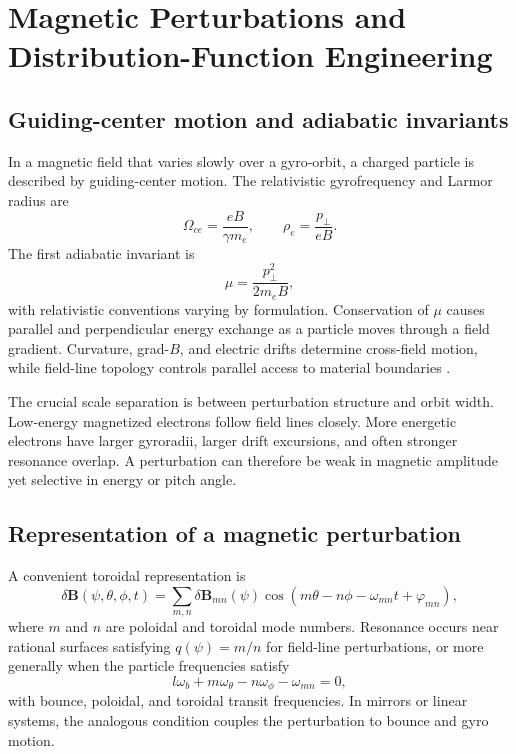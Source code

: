 \chapter{Magnetic Perturbations and Distribution-Function Engineering}
\label{ch:magnetic-control}

\section{Guiding-center motion and adiabatic invariants}

In a magnetic field that varies slowly over a gyro-orbit, a charged particle is described by guiding-center motion. The relativistic gyrofrequency and Larmor radius are
\begin{equation}
\Omega_{ce}=\frac{eB}{\gamma m_e},
\qquad
\rho_e=\frac{p_\perp}{eB}.
\label{eq:gyro}
\end{equation}
The first adiabatic invariant is
\begin{equation}
\mu=\frac{p_\perp^2}{2m_eB},
\label{eq:mu}
\end{equation}
with relativistic conventions varying by formulation. Conservation of $\mu$ causes parallel and perpendicular energy exchange as a particle moves through a field gradient. Curvature, grad-$B$, and electric drifts determine cross-field motion, while field-line topology controls parallel access to material boundaries \cite{hazeltine2003,freidberg2014,wesson2011}.

The crucial scale separation is between perturbation structure and orbit width. Low-energy magnetized electrons follow field lines closely. More energetic electrons have larger gyroradii, larger drift excursions, and often stronger resonance overlap. A perturbation can therefore be weak in magnetic amplitude yet selective in energy or pitch angle.

\section{Representation of a magnetic perturbation}

A convenient toroidal representation is
\begin{equation}
\delta\mathbf{B}(\psi,\theta,\phi,t)
=\sum_{m,n}\delta\mathbf{B}_{mn}(\psi)
\cos\!\left(m\theta-n\phi-\omega_{mn}t+\varphi_{mn}\right),
\label{eq:rmp}
\end{equation}
where $m$ and $n$ are poloidal and toroidal mode numbers. Resonance occurs near rational surfaces satisfying $q(\psi)=m/n$ for field-line perturbations, or more generally when the particle frequencies satisfy
\begin{equation}
 l\omega_b + m\omega_\theta-n\omega_\phi-\omega_{mn}=0,
\label{eq:particle-resonance}
\end{equation}
with bounce, poloidal, and toroidal transit frequencies. In mirrors or linear systems, the analogous condition couples the perturbation to bounce and gyro motion.

